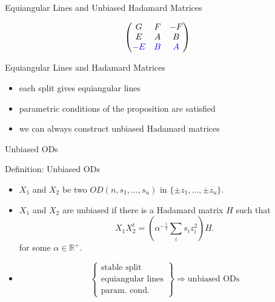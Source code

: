 \documentclass{beamer}
\newcommand{\bblue}[1]{\textcolor{blue}{#1}}
\begin{document}
\begin{frame}{Equiangular Lines and Unbiased Hadamard Matrices}

  \[
    \begin{pmatrix}
      G & F & -F \\
      E & A & B \\
      \bblue{-E} & \bblue{B} & \bblue{A}
    \end{pmatrix}
  \]
  
\end{frame}

\begin{frame}{Equiangular Lines and Hadamard Matrices}

  \begin{itemize}
  \item each split gives equiangular lines
  \item parametric conditions of the proposition are satisfied
  \item we can always construct unbiased Hadamard matrices
  \end{itemize}
  
\end{frame}


\begin{frame}{Unbiased ODs}

  \begin{block}{Definition: Unbiased ODs \cite[][]{unbiased-od}}
    \begin{itemize}
    \item $X_1$ and $X_2$ be two $OD(n,s_1, \dots,s_u)$ in $\{\pm z_1, \dots,
      \pm z_u\}$.
    \item $X_1$ and $X_2$ are unbiased if there is a Hadamard matrix $H$ such that
      \[
        X_1X_2^t = \left( \alpha^{-\frac{1}{2}}\sum_i s_iz_i^2 \right)H.
      \]
      for some $\alpha \in \mathbb{R}^+$.
    \end{itemize}
  \end{block}

  \begin{itemize}
  \pause\item
    \[
      \left\{
      \begin{array}{l}
        \text{stable split} \\
        \text{equiangular lines} \\
        \text{param. cond.}
      \end{array} \right\}
      \Rightarrow
      \text{unbiased ODs}
    \]
  \end{itemize}
  
\end{frame}
\end{document}
